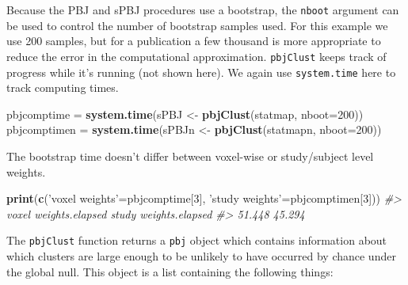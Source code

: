 \documentclass[]{article}
\newenvironment{Shaded}{\begin{snugshade}}{\end{snugshade}}
\newcommand{\KeywordTok}[1]{\textcolor[rgb]{0.13,0.29,0.53}{\textbf{#1}}}
\newcommand{\DataTypeTok}[1]{\textcolor[rgb]{0.13,0.29,0.53}{#1}}
\newcommand{\DecValTok}[1]{\textcolor[rgb]{0.00,0.00,0.81}{#1}}
\newcommand{\StringTok}[1]{\textcolor[rgb]{0.31,0.60,0.02}{#1}}
\newcommand{\CommentTok}[1]{\textcolor[rgb]{0.56,0.35,0.01}{\textit{#1}}}
\newcommand{\NormalTok}[1]{#1}
\begin{document}
Because the PBJ and sPBJ procedures use a bootstrap, the \texttt{nboot}
argument can be used to control the number of bootstrap samples used.
For this example we use 200 samples, but for a publication a few
thousand is more appropriate to reduce the error in the computational
approximation. \texttt{pbjClust} keeps track of progress while it's
running (not shown here). We again use \texttt{system.time} here to
track computing times.

\begin{Shaded}
\begin{Highlighting}[]
\NormalTok{pbjcomptime  =}\StringTok{ }\KeywordTok{system.time}\NormalTok{(sPBJ  <-}\StringTok{ }\KeywordTok{pbjClust}\NormalTok{(statmap,  }\DataTypeTok{nboot=}\DecValTok{200}\NormalTok{))}
\NormalTok{pbjcomptimen =}\StringTok{ }\KeywordTok{system.time}\NormalTok{(sPBJn <-}\StringTok{ }\KeywordTok{pbjClust}\NormalTok{(statmapn, }\DataTypeTok{nboot=}\DecValTok{200}\NormalTok{))}
\end{Highlighting}
\end{Shaded}

The bootstrap time doesn't differ between voxel-wise or study/subject
level weights.

\begin{Shaded}
\begin{Highlighting}[]
\KeywordTok{print}\NormalTok{(}\KeywordTok{c}\NormalTok{(}\StringTok{'voxel weights'}\NormalTok{=pbjcomptime[}\DecValTok{3}\NormalTok{], }\StringTok{'study weights'}\NormalTok{=pbjcomptimen[}\DecValTok{3}\NormalTok{]))}
\CommentTok{#> voxel weights.elapsed study weights.elapsed }
\CommentTok{#>                51.448                45.294}
\end{Highlighting}
\end{Shaded}

The \texttt{pbjClust} function returns a \texttt{pbj} object which
contains information about which clusters are large enough to be
unlikely to have occurred by chance under the global null. This object
is a list containing the following things:
\end{document}
